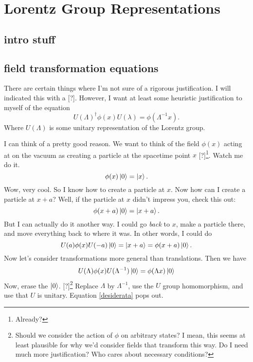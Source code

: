 \documentclass{book}
\begin{document}
\chapter{Lorentz Group Representations}

\section{intro stuff}

\section{field transformation equations}
There are certain things where I'm not sure of a rigorous justification. I will indicated this with a [?]. However, I want at least some heuristic justification to myself of the equation
\begin{equation} \label{desiderata} 
U(\Lambda)^{\dagger} \phi(x) U(\lambda) = \phi(\Lambda^{-1} x).
\end{equation}
Where $U(\Lambda)$ is some unitary representation of the Lorentz group.

I can think of a pretty good reason. We want to think of the field $\phi(x)$ acting at on the vacuum as creating a particle at the spacetime point $x$ [?]\footnote{Already?}. Watch me do it.
\[
\phi(x) \ket{0} = \ket{x}.
\]
Wow, very cool. So I know how to create a particle at $x$. Now how can I create a particle at $x + a$? Well, if the particle at $x$ didn't impress you, check this out:
\[
\phi(x + a) \ket{0} = \ket{x + a}.
\]
But I can actually do it another way. I could go \textit{back} to $x$, make a particle there, and move everything back to where it was. In other words, I could do
\[
U(a) \phi(x) U(-a) \ket{0} = \ket{x + a} = \phi(x + a) \ket{0}.
\]
Now let's consider transformations more general than translations. Then we have
\[
U(\Lambda) \phi(x) U(\Lambda^{-1}) \ket{0}= \phi(\Lambda x) \ket{0}
\]
Now, erase the $\ket{0}$. [?]\footnote{Should we consider the action of $\phi$ on arbitrary states? I mean, this seems at least plausible for why we'd consider fields that transform this way. Do I need much more justification? Who cares about necessary conditions?} Replace $\Lambda$ by $\Lambda^{-1}$, use the $U$ group homomorphism, and use that $U$ is unitary. Equation \ref{desiderata} pops out. 
\end{document}
